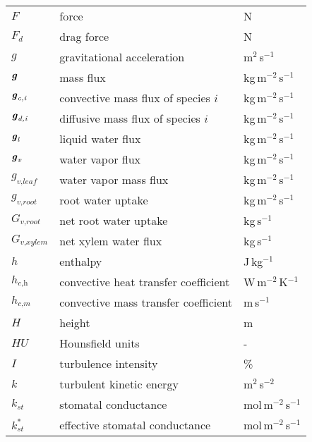 \begin{longtable}{p{}p{}p{}}
	$F$ & force & N \\	
	$F_d$ & drag force & N \\		
	$g$ & gravitational acceleration & m$^2$\,s$^{-1}$ \\ 
	$\textbf{\textit{g}}$ & mass flux & kg\,m$^{-2}$\,s$^{-1}$ \\ 		
	$\textbf{\textit{g}}_{\textit{c,i}}$ & convective mass flux of species $i$ & kg\,m$^{-2}$\,s$^{-1}$ \\ 			
	$\textbf{\textit{g}}_{\textit{d,i}}$ & diffusive mass flux of species $i$ & kg\,m$^{-2}$\,s$^{-1}$ \\ 				
	$\textbf{\textit{g}}_{\textit{l}}$ & liquid water flux & kg\,m$^{-2}$\,s$^{-1}$ \\ 		
	$\textbf{\textit{g}}_{\textit{v}}$ & water vapor flux & kg\,m$^{-2}$\,s$^{-1}$ \\ 		
	$g_{\textit{v,leaf}}$ & water vapor mass flux & kg\,m$^{-2}$\,s$^{-1}$ \\ 	
	$g_{\textit{v,root}}$ & root water uptake & kg\,m$^{-2}$\,s$^{-1}$ \\ 		
	$G_{\textit{v,root}}$ & net root water uptake & kg\,s$^{-1}$ \\ 		
	$G_{\textit{v,xylem}}$ & net xylem water flux & kg\,s$^{-1}$ \\ 		
	$h$ & enthalpy & J\,kg$^{-1}$ \\ 
	$h_{\textit{c,h}}$ & convective heat transfer coefficient & W\,m$^{-2}$\,K$^{-1}$ \\ 
	$h_{\textit{c,m}}$ & convective mass transfer coefficient & m\,s$^{-1}$ \\ 
	$H$ & height & m \\ 
	$HU$ & Hounsfield units & - \\ 
	$I$ & turbulence intensity & \% \\
	$k$ & turbulent kinetic energy & m$^2$\,s$^{-2}$ \\ 
	$k_{\textit{st}}$ & stomatal conductance & mol\,m$^{-2}$\,s$^{-1}$  \\ 	
	$k_{\textit{st}}^*$ & effective stomatal conductance & mol\,m$^{-2}$\,s$^{-1}$  \\ 		

\end{longtable}
